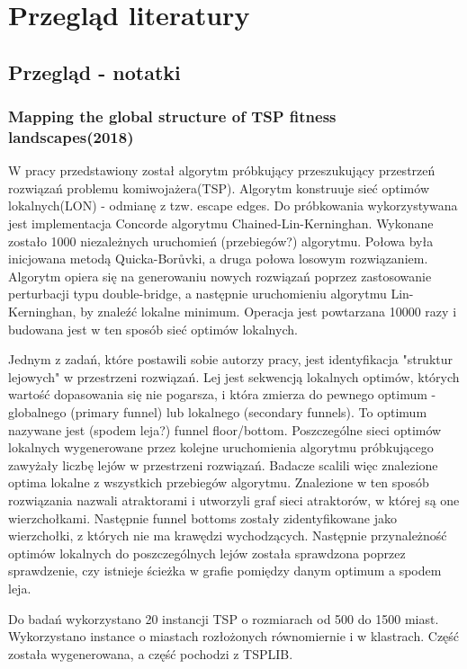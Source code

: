 \chapter{Przegląd literatury}
\section{Przegląd - notatki}

\subsection*{Mapping the global structure of TSP fitness landscapes(2018)\cite{DBLP:journals/heuristics/OchoaV18}}
W pracy przedstawiony został algorytm próbkujący przeszukujący przestrzeń rozwiązań problemu komiwojażera(TSP).
Algorytm konstruuje sieć optimów lokalnych(LON) - odmianę z tzw. escape edges.
Do próbkowania wykorzystywana jest implementacja Concorde algorytmu Chained-Lin-Kerninghan.
Wykonane zostało 1000 niezależnych uruchomień (przebiegów?) algorytmu.
Połowa była inicjowana metodą Quicka-Borůvki, a druga połowa losowym rozwiązaniem.
Algorytm opiera się na generowaniu nowych rozwiązań poprzez zastosowanie perturbacji typu double-bridge,
a następnie uruchomieniu algorytmu Lin-Kerninghan, by znaleźć lokalne minimum.
Operacja jest powtarzana 10000 razy i budowana jest w ten sposób sieć optimów lokalnych.

Jednym z zadań, które postawili sobie autorzy pracy, jest identyfikacja "struktur lejowych"
w przestrzeni rozwiązań. Lej jest sekwencją lokalnych optimów, których wartość dopasowania
się nie pogarsza, i która zmierza do pewnego optimum - globalnego (primary funnel) lub lokalnego (secondary funnels).
To optimum nazywane jest (spodem leja?) funnel floor/bottom.
Poszczególne sieci optimów lokalnych wygenerowane przez kolejne uruchomienia algorytmu próbkującego
zawyżały liczbę lejów w przestrzeni rozwiązań.
Badacze scalili więc znalezione optima lokalne z wszystkich przebiegów algorytmu.
Znalezione w ten sposób rozwiązania nazwali atraktorami i utworzyli graf sieci atraktorów, w której są one wierzchołkami.
Następnie funnel bottoms zostały zidentyfikowane jako wierzchołki, z których nie ma krawędzi wychodzących.
Następnie przynależność optimów lokalnych do poszczególnych lejów została sprawdzona poprzez sprawdzenie,
czy istnieje ścieżka w grafie pomiędzy danym optimum a spodem leja.

Do badań wykorzystano 20 instancji TSP o rozmiarach od 500 do 1500 miast.
Wykorzystano instance o miastach rozłożonych równomiernie i w klastrach.
Część została wygenerowana, a część pochodzi z TSPLIB.

